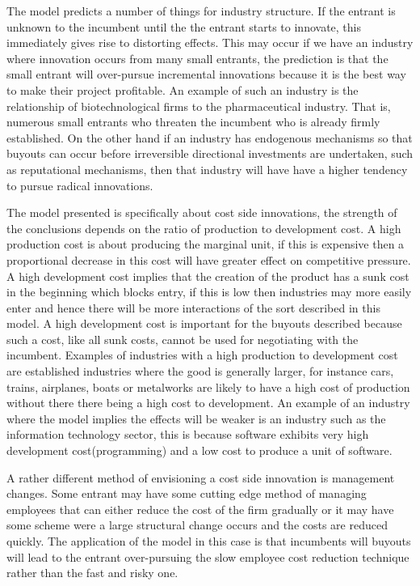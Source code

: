 The model predicts a number of things for industry structure. If the entrant is unknown to the incumbent until the the entrant starts to innovate, this immediately gives rise to distorting effects.  This may occur if we have an industry where innovation occurs from many small entrants, the prediction is that the small entrant will over-pursue incremental innovations because it is the best way to make their project profitable. An example of such an industry is the relationship of biotechnological firms to the pharmaceutical industry. That is, numerous small entrants who threaten the incumbent who is already firmly established. On the other hand if an industry has endogenous mechanisms so that buyouts can occur before irreversible directional investments are undertaken, such as reputational mechanisms, then that industry will have have a higher tendency to pursue radical innovations. 

The model presented is specifically about cost side innovations, the strength of the conclusions depends on the ratio of production to development cost. A high production cost is about producing the marginal unit, if this is expensive then a proportional decrease in this cost will have greater effect on competitive pressure. A high development cost implies that the creation of the product has a sunk cost in the beginning which blocks entry, if this is low then industries may more easily enter and hence there will be more interactions of the sort described in this model. A high development cost is important for the buyouts described because such a cost, like all sunk costs, cannot be used for negotiating with the incumbent. Examples of industries with a high production to development cost are established industries where the good is generally larger, for instance cars, trains, airplanes, boats or metalworks are likely to have a high cost of production without there there being a high cost to development. An example of an industry where the model implies the effects will be weaker is an industry such as the information technology sector, this is because software exhibits very high development cost(programming) and a low cost to produce a unit of software.  

A rather different method of envisioning a cost side innovation is management changes. Some entrant may have some cutting edge method of managing employees that can either reduce the cost of the firm gradually or it may have some scheme were a large structural change occurs and the costs are reduced quickly. The application of the model in this case is that incumbents will buyouts will lead to the entrant over-pursuing the slow employee cost reduction technique rather than the fast and risky one.  

